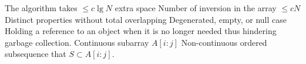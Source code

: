 %
%


 The algorithm takes $\leq c \lg N$ extra space
 Number of inversion in the array $\leq cN$
 Distinct properties without total overlapping
 Degenerated, empty, or null case
 Holding a reference to an object when it is no longer needed thus hindering garbage collection. 
 Continuous subarray $A[i:j]$
 Non-continuous ordered subsequence that $S\subset A[i:j]$.
